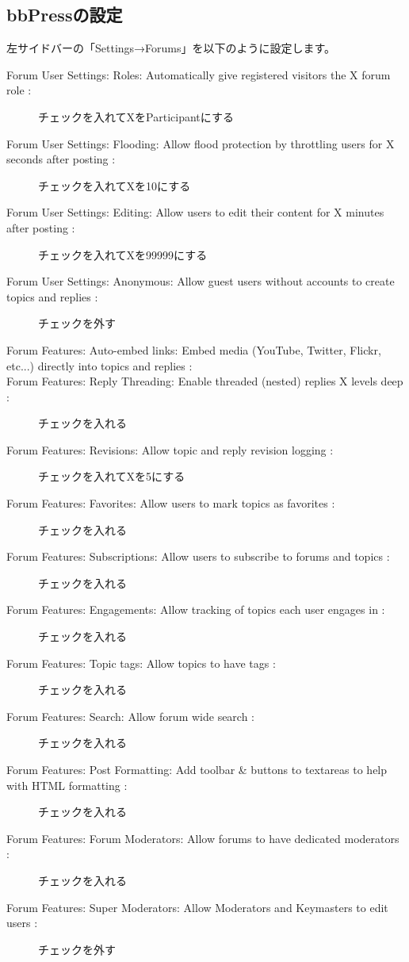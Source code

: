 \documentclass[titlepage,10pt,a4paper,uplatex]{jsbook}
\begin{document}
\subsection{bbPressの設定}

左サイドバーの「Settings→Forums」を以下のように設定します。

\begin{description}
\item[Forum User Settings: Roles: Automatically give registered visitors the X forum role : ] チェックを入れてXをParticipantにする
\item[Forum User Settings: Flooding: Allow flood protection by throttling users for X seconds after posting : ] チェックを入れてXを10にする
\item[Forum User Settings: Editing: Allow users to edit their content for X minutes after posting : ] チェックを入れてXを99999にする
\item[Forum User Settings: Anonymous: Allow guest users without accounts to create topics and replies : ] チェックを外す
\item[Forum Features: Auto-embed links: Embed media (YouTube, Twitter, Flickr, etc...) directly into topics and replies : ] 
\item[Forum Features: Reply Threading: Enable threaded (nested) replies X levels deep : ] チェックを入れる
\item[Forum Features: Revisions: Allow topic and reply revision logging : ] チェックを入れてXを5にする
\item[Forum Features: Favorites: Allow users to mark topics as favorites : ] チェックを入れる
\item[Forum Features: Subscriptions: Allow users to subscribe to forums and topics : ] チェックを入れる
\item[Forum Features: Engagements: Allow tracking of topics each user engages in : ] チェックを入れる
\item[Forum Features: Topic tags: Allow topics to have tags : ] チェックを入れる
\item[Forum Features: Search: Allow forum wide search : ] チェックを入れる
\item[Forum Features: Post Formatting: Add toolbar \& buttons to textareas to help with HTML formatting : ] チェックを入れる
\item[Forum Features: Forum Moderators: Allow forums to have dedicated moderators : ] チェックを入れる
\item[Forum Features: Super Moderators: Allow Moderators and Keymasters to edit users : ] チェックを外す

\end{description}
\end{document}
